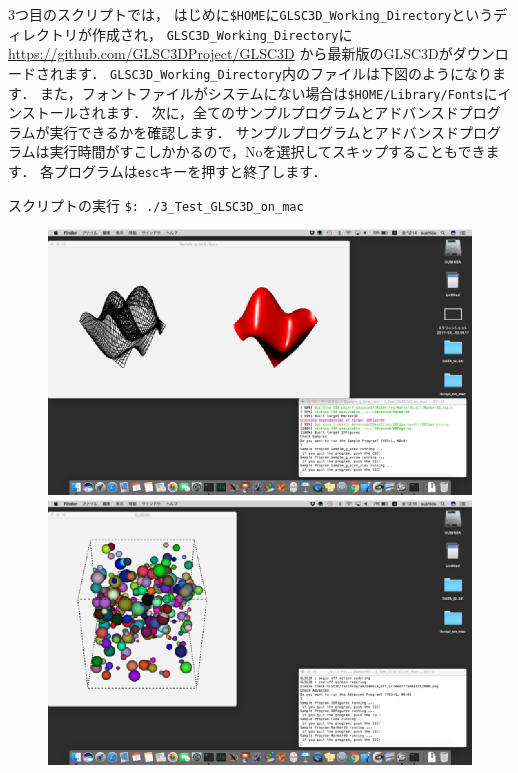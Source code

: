 \documentclass[platex,a4paper,12pt]{jsarticle}%
\begin{document}
3つ目のスクリプトでは，
はじめに\verb|$HOME|に\verb|GLSC3D_Working_Directory|というディレクトリが作成され，
\verb|GLSC3D_Working_Directory|に
\url{https://github.com/GLSC3DProject/GLSC3D}
から最新版のGLSC3Dがダウンロードされます．
\verb|GLSC3D_Working_Directory|内のファイルは下図のようになります．
また，フォントファイルがシステムにない場合は\verb|$HOME/Library/Fonts|にインストールされます．
次に，全てのサンプルプログラムとアドバンスドプログラムが実行できるかを確認します．
サンプルプログラムとアドバンスドプログラムは実行時間がすこしかかるので，Noを選択してスキップすることもできます．
各プログラムは\verb|esc|キーを押すと終了します．

\begin{itembox}[l]{スクリプトの実行}
\verb|$: ./3_Test_GLSC3D_on_mac|
\end{itembox}

\begin{figure}[htb]
\centering
\includegraphics[scale=.6]{./Figures/eps/Canvas_Samples.eps}
\hspace{2zw}
\includegraphics[scale=.6]{./Figures/eps/Canvas_Advanced.eps}
\end{figure}
\end{document}
